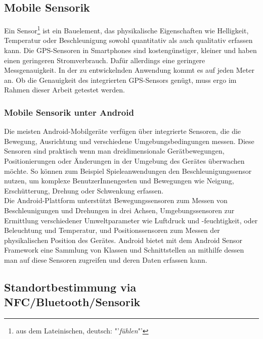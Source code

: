 \subsection{Mobile Sensorik} 
Ein Sensor\footnote{ aus dem Lateinischen, deutsch: "'\textit{fühlen}"'} ist ein Bauelement, das physikalische Eigenschaften wie Helligkeit, Temperatur oder Beschleunigung sowohl quantitativ als auch qualitativ erfassen kann. Die \gls{GPS}-Sensoren in \glspl{Smartphone} sind kostengünstiger, kleiner und haben einen geringeren Stromverbrauch. Dafür allerdings eine geringere Messgenauigkeit. In der zu entwickelnden Anwendung kommt es auf jeden Meter an. Ob die Genauigkeit des integrierten \gls{GPS}-Sensors genügt, muss ergo im Rahmen dieser Arbeit getestet werden. 
\subsubsection{Mobile Sensorik unter Android}
Die meisten Android-Mobilgeräte verfügen über integrierte Sensoren, die die Bewegung, Ausrichtung und verschiedene Umgebungsbedingungen messen. Diese Sensoren sind praktisch wenn man dreidimensionale Gerätbewegungen, Positionierungen oder Änderungen in der Umgebung des Gerätes überwachen möchte. So können zum Beispiel Spieleanwendungen den Beschleunigungssensor nutzen, um komplexe BenutzerInnengesten und Bewegungen wie Neigung, Erschütterung, Drehung oder Schwenkung erfassen.\\
Die Android-Plattform unterstützt Bewegungssensoren zum Messen von Beschleunigungen und Drehungen in drei Achsen, Umgebungssensoren zur Ermittlung verschiedener Umweltparameter wie Luftdruck und -feuchtigkeit, oder Beleuchtung und Temperatur, und Positionssensoren zum Messen der physikalischen Position des Gerätes. Android bietet mit dem Android Sensor Framework eine Sammlung von Klassen und Schnittstellen an mithilfe dessen man auf diese Sensoren zugreifen und deren Daten erfassen kann. \cite{android_sensor}  
\subsection{Standortbestimmung via NFC/Bluetooth/Sensorik}

%
%
